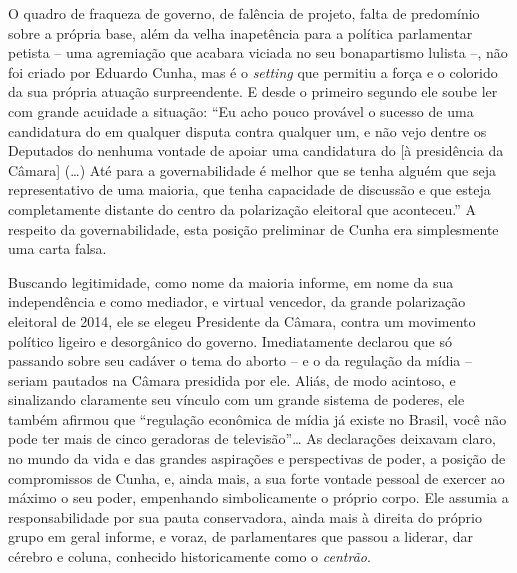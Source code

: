 O quadro de fraqueza de governo, de falência de projeto, falta de
predomínio sobre a própria base, além da velha inapetência para a
política parlamentar petista -- uma agremiação que acabara viciada no
seu bonapartismo lulista --, não foi criado por Eduardo Cunha, mas é o
\emph{setting} que permitiu a força e o colorido da sua própria atuação
surpreendente. E desde o primeiro segundo ele soube ler com grande
acuidade a situação: ``Eu acho pouco provável o sucesso de uma
candidatura do  em qualquer disputa contra qualquer um, e não vejo
dentre os Deputados do  nenhuma vontade de apoiar uma candidatura do
 {[}à presidência da Câmara{]} (…) Até para a governabilidade é
melhor que se tenha alguém que seja representativo de uma maioria, que
tenha capacidade de discussão e que esteja completamente distante do
centro da polarização eleitoral que aconteceu.'' A respeito da
governabilidade, esta posição preliminar de Cunha era simplesmente uma
carta falsa.

Buscando legitimidade, como nome da maioria informe, em nome da sua
independência e como mediador, e virtual vencedor, da grande polarização
eleitoral de 2014, ele se elegeu Presidente da Câmara, contra um
movimento político ligeiro e desorgânico do governo. Imediatamente
declarou que só passando sobre seu cadáver o tema do aborto -- e o da
regulação da mídia -- seriam pautados na Câmara presidida por ele.
Aliás, de modo acintoso, e sinalizando claramente seu vínculo com um
grande sistema de poderes, ele também afirmou que ``regulação econômica
de mídia já existe no Brasil, você não pode ter mais de cinco geradoras
de televisão''… As declarações deixavam claro, no mundo da vida e das
grandes aspirações e perspectivas de poder, a posição de compromissos de
Cunha, e, ainda mais, a sua forte vontade pessoal de exercer ao máximo o
seu poder, empenhando simbolicamente o próprio corpo. Ele assumia a
responsabilidade por sua pauta conservadora, ainda mais à direita do
próprio grupo em geral informe, e voraz, de parlamentares que passou a
liderar, dar cérebro e coluna, conhecido historicamente como o
\emph{centrão}.

